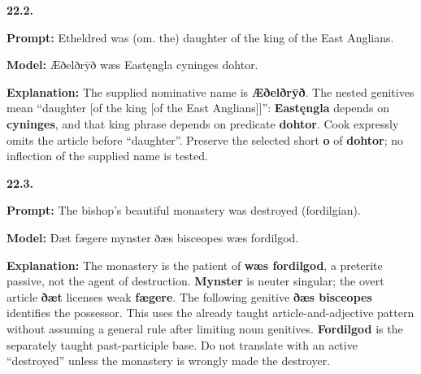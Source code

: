 \par\begin{minipage}{\linewidth}\raggedright
\textbf{22.2.}

\textbf{Prompt:} Etheldred was (om. the) daughter of the king of the East Anglians.

\textbf{Model:} Æðelðrȳð wæs Eastęngla cyninges dohtor.

\textbf{Explanation:} The supplied nominative name is \textbf{Æðelðrȳð}. The nested genitives mean “daughter [of the king [of the East Anglians]]”: \textbf{Eastęngla} depends on \textbf{cyninges}, and that king phrase depends on predicate \textbf{dohtor}. Cook expressly omits the article before “daughter”. Preserve the selected short \textbf{o} of \textbf{dohtor}; no inflection of the supplied name is tested.

\end{minipage}\par\addvspace{4pt}

\par\begin{minipage}{\linewidth}\raggedright
\textbf{22.3.}

\textbf{Prompt:} The bishop’s beautiful monastery was destroyed (fordilgian).

\textbf{Model:} Ðæt fægere mynster ðæs bisceopes wæs fordilgod.

\textbf{Explanation:} The monastery is the patient of \textbf{wæs fordilgod}, a preterite passive, not the agent of destruction. \textbf{Mynster} is neuter singular; the overt article \textbf{ðæt} licenses weak \textbf{fægere}. The following genitive \textbf{ðæs bisceopes} identifies the possessor. This uses the already taught article-and-adjective pattern without assuming a general rule after limiting noun genitives. \textbf{Fordilgod} is the separately taught past-participle base. Do not translate with an active “destroyed” unless the monastery is wrongly made the destroyer.

\end{minipage}\par\addvspace{4pt}

